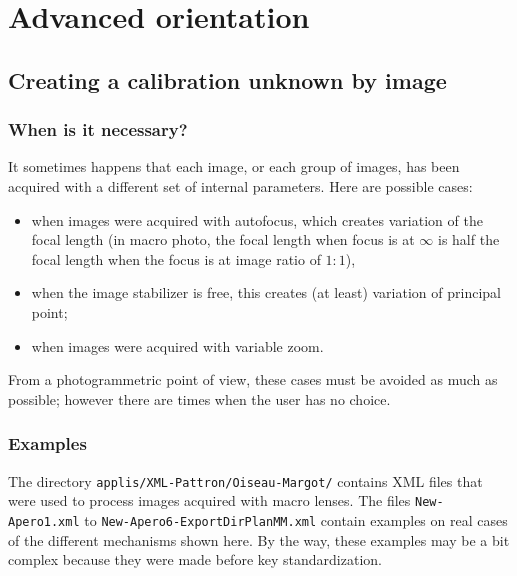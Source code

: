 \chapter{Advanced orientation}



\section{Creating a calibration unknown by image}

\subsection{When is it necessary?}

It sometimes happens that each image, or each group of images,
has been acquired with a different set of internal parameters. Here
are possible cases:

\begin{itemize}
    \item when images were acquired with autofocus, which creates variation
          of the focal length (in macro photo, the focal length when focus is
          at $\infty$ is half the focal length when the focus is at image ratio of $1:1$),


    \item when  the image stabilizer is free, this creates (at least)
          variation of principal point;

    \item when  images were acquired with variable zoom.
\end{itemize}


From a photogrammetric point of view, these cases must be avoided
as much as possible; however there are times when the user has no
choice.

\subsection{Examples}

The directory {\tt applis/XML-Pattron/Oiseau-Margot/} contains XML
files that were used to process images acquired with macro lenses.
The files {\tt New-Apero1.xml} to {\tt New-Apero6-ExportDirPlanMM.xml}
contain examples on real cases of the different mechanisms shown
here. By the way, these examples may be a bit complex because they
were made before key standardization.

